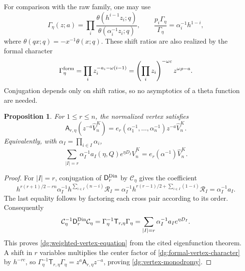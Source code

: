 \documentclass[11pt]{amsart}
\newtheorem{proposition}[theorem]{Proposition}
\theoremstyle{definition}
\theoremstyle{remark}
\numberwithin{equation}{section}
\begin{document}
For comparison with the raw family, one may use
\begin{equation}\label{dg:theta-character}
 \Gamma_\eta(z;a)=\prod_i
 \frac{\theta(h^{i-1}z_i;q)}{\theta(\alpha_i^{-1}z_i;q)},
 \qquad
 \frac{p_i\Gamma_\eta}{\Gamma_\eta}
 =\alpha_i^{-1}h^{1-i},
\end{equation}
where $\theta(qx;q)=-x^{-1}\theta(x;q)$.
These shift ratios are also realized by the formal character
\begin{equation}\label{dg:formal-vertex-character}
 \Gamma_\eta^{\rm form}
 =\prod_i z_i^{-a_i-\omega(i-1)}
 =\left(\prod_i z_i\right)^{-\omega c}z^{\omega\rho-a}.
\end{equation}
Conjugation depends only on shift ratios, so no asymptotics of a
theta function are needed.

\begin{proposition}\label{dg:kahler-input}
For $1\leq r\leq n$, the normalized vertex satisfies
\begin{equation}\label{dg:vertex-monodromy}
 \mathsf A_{r,\eta}(z^{-a}\widehat V_n^K)
 =e_r(\alpha_1^{-1},\ldots,\alpha_n^{-1})
 z^{-a}\widehat V_n^K.
\end{equation}
Equivalently, with $\alpha_I=\prod_{i\in I}\alpha_i$,
\begin{equation}\label{dg:weighted-vertex-equation}
 \sum_{|I|=r}\alpha_I^{-1}a_I(\eta,Q)
 e^{\eta D_I}\widehat V_n^K
 =e_r(\alpha^{-1})\widehat V_n^K.
\end{equation}
\end{proposition}

\begin{proof}
For $|I|=r$, conjugation of $\mathsf D_r^{\rm Din}$ by
$\mathcal C_\eta$ gives the coefficient
\[
 h^{r(r+1)/2-rn}\alpha_I^{-1}
 h^{\sum_{i\in I}(n-i)}\mathcal R_I
 =\alpha_I^{-1}
 h^{r(r-1)/2+\sum_{i\in I}(1-i)}\mathcal R_I
 =\alpha_I^{-1}a_I.
\]
The last equality follows by factoring each cross pair according
to its order. Consequently
\begin{equation}\label{dg:theta-conjugation}
 \mathcal C_\eta^{-1}\mathsf D_r^{\rm Din}\mathcal C_\eta
 =\Gamma_\eta^{-1}\mathsf T_{r,\eta}\Gamma_\eta
 =\sum_{|I|=r}\alpha_I^{-1}a_Ie^{\eta D_I}.
\end{equation}
This proves \eqref{dg:weighted-vertex-equation} from the cited
eigenfunction theorem. A shift in $r$ variables multiplies the
center factor of \eqref{dg:formal-vertex-character} by $h^{-rc}$,
so
$\Gamma_\eta^{-1}\mathsf T_{r,\eta}\Gamma_\eta
=z^a\mathsf A_{r,\eta}z^{-a}$, proving
\eqref{dg:vertex-monodromy}.
\end{proof}
\end{document}
